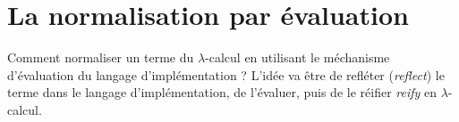 \section{La normalisation par évaluation}
Comment normaliser un terme du $\lambda$-calcul en utilisant le méchanisme d'évaluation du langage d'implémentation ?
L'idée va être de refléter (\textit{reflect}) le terme dans le langage d'implémentation, de l'évaluer, puis de le réifier \textit{reify} 
en $\lambda$-calcul.


